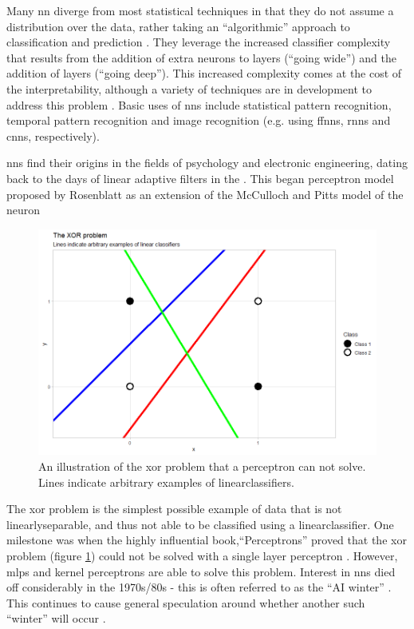 Many \gls{nn} diverge from most statistical techniques in that they do not assume a distribution over the data, rather taking an \enquote{algorithmic} approach to classification and prediction \cite{two_cultures}. They leverage the increased classifier complexity that results from the addition of extra neurons to layers (\enquote{going wide}) and the addition of \gls{layer}s (\enquote{going deep}). This increased complexity comes at the cost of the interpretability, although a variety of techniques are in development to address this problem \cite{nn_interpretability}. Basic uses of \gls{nn}s include statistical pattern recognition, temporal pattern recognition and image recognition (e.g. using \gls{ffnn}s, \gls{rnn}s and \gls{cnn}s, respectively).

\gls{nn}s find their origins in the fields of psychology and electronic engineering, dating back to the days of linear adaptive filters in the \cite{haykin}. This began perceptron model proposed by Rosenblatt \cite{perceptron_paper} as an extension of the McCulloch and Pitts model of the neuron \cite{logical_calculus} \bigskip

\begin{figure}
    \centering
    \includegraphics[width=120mm]{figs/xor_problem.png}
    \caption[The \gls{xor} problem]{An illustration of the \gls{xor} problem that a perceptron can not solve. Lines indicate arbitrary examples of \gls{linearclassifier}s.}
    \label{fig:xor_problem}
\end{figure}

The \gls{xor} problem is the simplest possible example of data that is not \gls{linearlyseparable}, and thus not able to be classified using a \gls{linearclassifier}. One milestone was when the highly influential book,\enquote{Perceptrons} proved that the \gls{xor} problem (figure \ref{fig:xor_problem}) could not be solved with a single layer perceptron \cite[Chapter~4]{perceptron_book}. However, \gls{mlp}s and kernel perceptrons are able to solve this problem. Interest in \gls{nn}s died off considerably in the 1970s/80s - this is often referred to as the \enquote{AI winter} \cite{ai_winter}. This continues to cause general speculation around whether another such \enquote{winter} will occur \cite{ai_winter_spec}.  \bigskip

